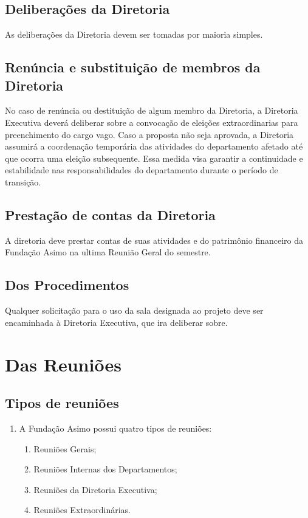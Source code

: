     \section{Deliberações da Diretoria}
        As deliberações da Diretoria devem ser tomadas por maioria simples.
    \section{Renúncia e substituição de membros da Diretoria}
        No caso de renúncia ou destituição de algum membro da Diretoria, a Diretoria Executiva deverá deliberar sobre a convocação de eleições extraordinarias para preenchimento do cargo vago. Caso a proposta não seja aprovada, a Diretoria assumirá a coordenação temporária das atividades do departamento afetado até que ocorra uma eleição subsequente. Essa medida visa garantir a continuidade e estabilidade nas responsabilidades do departamento durante o período de transição.
    \section{Prestação de contas da Diretoria}
        A diretoria deve prestar contas de suas atividades e do patrimônio financeiro da Fundação Asimo na ultima Reunião Geral do semestre.
    \section{Dos Procedimentos}
        Qualquer solicitação para o uso da sala designada ao projeto deve ser encaminhada à Diretoria Executiva, que ira deliberar sobre.
\chapter{Das Reuniões}
    \section{Tipos de reuniões}
    \begin{enumerate}
        \item A Fundação Asimo possui quatro tipos de reuniões:
        \begin{enumerate}
            \item Reuniões Gerais;
            \item Reuniões Internas dos Departamentos;
            \item Reuniões da Diretoria Executiva;
            \item Reuniões Extraordinárias.
        \end{enumerate}
    \end{enumerate}
    
